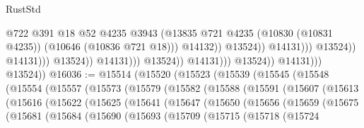 \begin{lexlean}{RustStd}
\begin{coremodule}
                                                              @722
                                                              @391
                                                              @18
                                                              @52
                                                              @4235
                                                              @3943
                                                              (@13835
                                                                @721
                                                                @4235
                                                                (@10830 (@10831 @4235))
                                                                (@10646 (@10836 @721 @18)))
                                                              @14132))
                                                          @13524))
                                                      @14131)))
                                                @13524))
                                            @14131)))
                                      @13524))
                                  @14131)))
                            @13524))
                        @14131)))
                  @13524))
              @14131)))
        @13524))
@16036 := @15514
    (@15520
      (@15523
        (@15539
          (@15545
            (@15548
              (@15554
                (@15557
                  (@15573
                    (@15579
                      (@15582
                        (@15588
                          (@15591
                            (@15607
                              (@15613
                                (@15616
                                  (@15622
                                    (@15625
                                      (@15641
                                        (@15647
                                          (@15650
                                            (@15656
                                              (@15659
                                                (@15675
                                                  (@15681
                                                    (@15684
                                                      (@15690
                                                        (@15693
                                                          (@15709
                                                            (@15715
                                                              (@15718
                                                                (@15724

\end{coremodule}
\end{lexlean}

